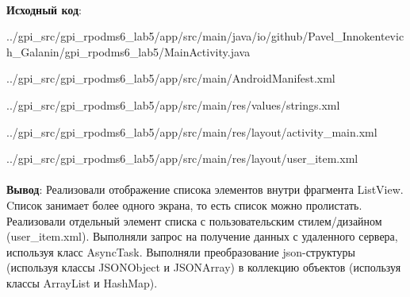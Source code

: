 \documentclass[12pt, a4paper, simple]{eskdtext}
\begin{document}
    \newpage
    \paragraph{} \textbf{Исходный код}: 

    
        {../gpi_src/gpi_rpodms6_lab5/app/src/main/java/io/github/Pavel_Innokentevich_Galanin/gpi_rpodms6_lab5/MainActivity.java}

    
        {../gpi_src/gpi_rpodms6_lab5/app/src/main/AndroidManifest.xml}

    
        {../gpi_src/gpi_rpodms6_lab5/app/src/main/res/values/strings.xml}
    
    
        {../gpi_src/gpi_rpodms6_lab5/app/src/main/res/layout/activity_main.xml}

    
        {../gpi_src/gpi_rpodms6_lab5/app/src/main/res/layout/user_item.xml}

    \paragraph{} \textbf{Вывод}:
    Реализовали отображение списока элементов внутри фрагмента ListView.
    Cписок занимает более одного экрана, то есть список можно пролистать.
    Реализовали отдельный элемент списка с пользовательским стилем/дизайном (user\_item.xml).
    Выполняли запрос на получение данных с удаленного сервера, используя класс AsyncTask.
    Выполняли преобразование json-структуры (используя классы JSONObject и JSONArray) в коллекцию объектов (используя классы ArrayList и HashMap).

\end{document}

